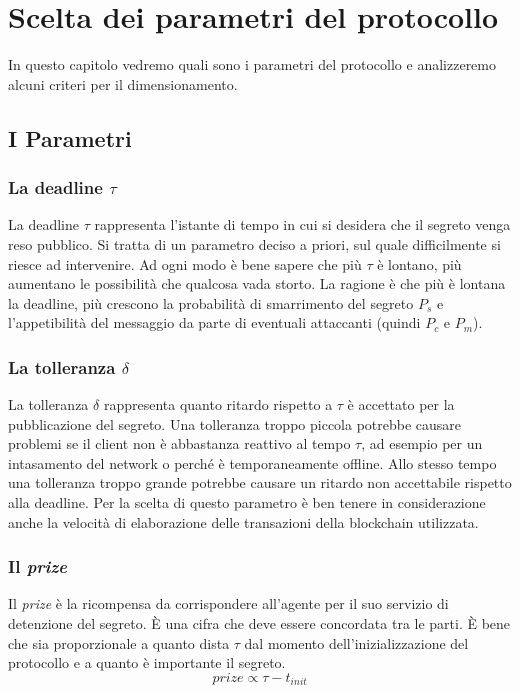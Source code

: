 \chapter{Scelta dei parametri del protocollo}
\label{chap:dimensionamento}

In questo capitolo vedremo quali sono i parametri del protocollo
e analizzeremo alcuni criteri per il dimensionamento.

\section{I Parametri}

\subsection{La deadline $ \tau $}
La deadline $ \tau $ rappresenta l'istante di tempo in cui
si desidera che il segreto venga reso pubblico.
Si tratta di un parametro deciso a priori, sul quale difficilmente si riesce ad
intervenire. Ad ogni modo è bene sapere che più $ \tau $ è lontano, più aumentano
le possibilità che qualcosa vada storto. La ragione è che più è lontana la deadline,
più crescono la probabilità di smarrimento del segreto $ P_s $ e l'appetibilità
del messaggio da parte di eventuali attaccanti (quindi $ P_c $ e $ P_m $).

\subsection{La tolleranza $ \delta $}
La tolleranza $ \delta $ rappresenta quanto ritardo rispetto a $ \tau $ è
accettato per la pubblicazione del segreto. Una tolleranza troppo
piccola potrebbe causare problemi se il client non è abbastanza reattivo
al tempo $ \tau $, ad esempio
per un intasamento del network o
perché è
temporaneamente offline.
Allo stesso tempo una tolleranza
troppo grande potrebbe causare un ritardo non accettabile rispetto alla deadline.
Per la scelta di questo parametro è ben tenere in considerazione anche
la velocità di elaborazione delle transazioni
della blockchain utilizzata.

\subsection{Il \textit{prize}}
Il \textit{prize} è la ricompensa da corrispondere all'agente per il suo servizio
di detenzione del segreto. È una cifra che deve essere concordata tra le parti.
È bene che sia proporzionale a quanto dista $ \tau $ dal momento
dell'inizializzazione del protocollo
e a quanto è importante il segreto.
$$ \textit{prize} \propto \tau - t_{init} $$

